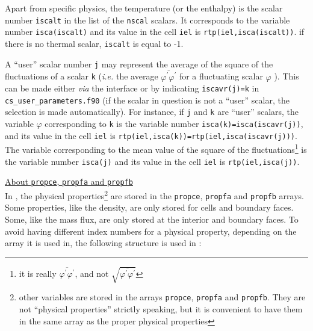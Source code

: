 {{{\begin{list}{-}{}
\item Apart from specific physics, the temperature (or the enthalpy) is the scalar number
      \texttt{iscalt} in the list of the \texttt{nscal}
      scalars. It corresponds to the variable number \texttt{isca(iscalt)}
      and its value in the cell \texttt{iel} is
      \texttt{rtp(iel,isca(iscalt))}. if there is no thermal scalar,
      \texttt{iscalt} is equal to -1.
\item A ``user'' scalar number \texttt{j} may represent the average of the
      square of the fluctuations of a scalar \texttt{k} ({\em i.e.} the average
      $\overline{\varphi^\prime\varphi^\prime}$ for a fluctuating scalar
      $\varphi$ ). This can be made either {\em via} the
      interface or by indicating \texttt{iscavr(j)=k} in
      \texttt{cs\_user\_parameters.f90} (if the scalar in question is not a ``user''
      scalar, the selection is made automatically). For instance, if \texttt{j}
      and \texttt{k} are ``user'' scalars, the variable $\varphi$ corresponding
      to \texttt{k} is the variable number \texttt{isca(k)=isca(iscavr(j))},
      and its value in the cell \texttt{iel} is \texttt{rtp(iel,isca(k))=rtp(iel,isca(iscavr(j)))}. \\
The variable corresponding to the mean value of the square of the
      fluctuations\footnote{it is really
      $\overline{\varphi^\prime\varphi^\prime}$, and not
      $\displaystyle\sqrt{\overline{\varphi^\prime\varphi^\prime}}$} is
      the variable number \texttt{isca(j)} and its value in the cell \texttt{iel}
      is \texttt{rtp(iel,isca(j))}.
\end{list}

\bigskip

\underline{About \texttt{propce}, \texttt{propfa} and \texttt{propfb}}\\
In \CS, the physical properties\footnote{other variables are stored in the
arrays \texttt{propce}, \texttt{propfa} and \texttt{propfb}. They are not
``physical properties'' strictly speaking, but it is convenient to have them
in the same array as the proper physical properties} are stored in the
\texttt{propce}, \texttt{propfa} and \texttt{propfb} arrays.
Some properties, like the density, are only stored for cells and boundary
faces. Some, like the mass flux, are only stored at the interior and boundary
faces. To avoid having different index numbers for a physical property,
depending on the array it is used in, the following structure is used in \CS:

}}}
